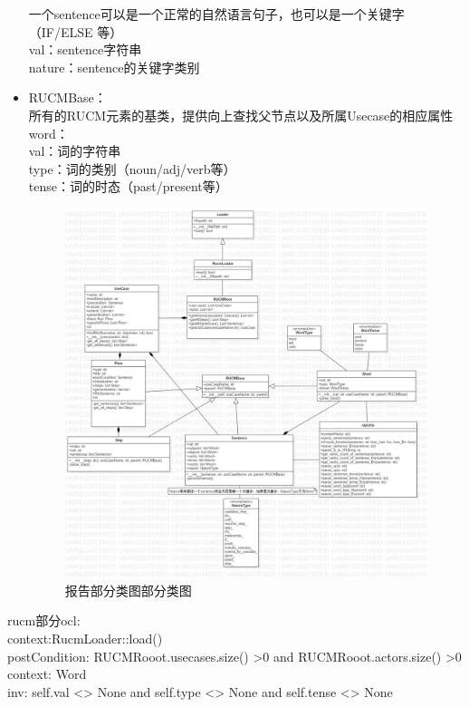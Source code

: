 \begin{itemize}
   		一个sentence可以是一个正常的自然语言句子，也可以是一个关键字（IF/ELSE 等）\\
   		val：sentence字符串\\
   		nature：sentence的关键字类别
   		\item 	RUCMBase：\\
   		所有的RUCM元素的基类，提供向上查找父节点以及所属Usecase的相应属性
   		word：\\
   		val：词的字符串\\
   		type：词的类别（noun/adj/verb等）\\
   		tense：词的时态（past/present等）
   		\begin{figure}
   			\centering
   			\includegraphics[width=1\textwidth]{./src/classDiagram_rucmElement.jpg} 
   			\caption{报告部分类图部分类图} 
   		\end{figure}
   	\end{itemize}
   	rucm部分ocl:\\
   	context:RucmLoader::load()\\
   	postCondition: RUCMRooot.usecases.size() >0 and RUCMRooot.actors.size() >0\\ 
   	context: Word\\
   	inv: self.val <> None and self.type <> None and self.tense <> None\\
